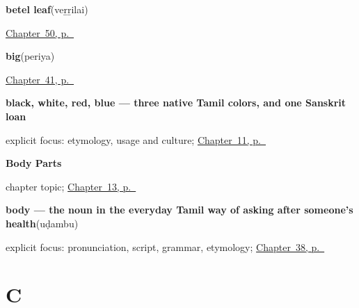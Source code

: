 \noindent\begin{minipage}[t]{\linewidth}
\raggedright
\textbf{betel leaf}\enspace\emph{}\enspace(veṟṟilai)\par
\footnotesize \hyperref[ch:ta-at-the-doorway]{Chapter~50, p.~\pageref*{ch:ta-at-the-doorway}}
\end{minipage}\par\smallskip

\noindent\begin{minipage}[t]{\linewidth}
\raggedright
\textbf{big}\enspace\emph{}\enspace(periya)\par
\footnotesize \hyperref[ch:ta-describing-things]{Chapter~41, p.~\pageref*{ch:ta-describing-things}}
\end{minipage}\par\smallskip

\noindent\begin{minipage}[t]{\linewidth}
\raggedright
\textbf{black, white, red, blue — three native Tamil colors, and one Sanskrit loan}\enspace\emph{   }\par
\footnotesize explicit focus: etymology, usage and culture; \hyperref[ch:ta-colours]{Chapter~11, p.~\pageref*{ch:ta-colours}}
\end{minipage}\par\smallskip

\noindent\begin{minipage}[t]{\linewidth}
\raggedright
\textbf{Body Parts}\par
\footnotesize chapter topic; \hyperref[ch:ta-body-parts]{Chapter~13, p.~\pageref*{ch:ta-body-parts}}
\end{minipage}\par\smallskip

\noindent\begin{minipage}[t]{\linewidth}
\raggedright
\textbf{body — the noun in the everyday Tamil way of asking after someone's health}\enspace\emph{}\enspace(uḍambu)\par
\footnotesize explicit focus: pronunciation, script, grammar, etymology; \hyperref[ch:ta-keeping-well-and-leaving]{Chapter~38, p.~\pageref*{ch:ta-keeping-well-and-leaving}}
\end{minipage}\par\smallskip

\section*{C}

